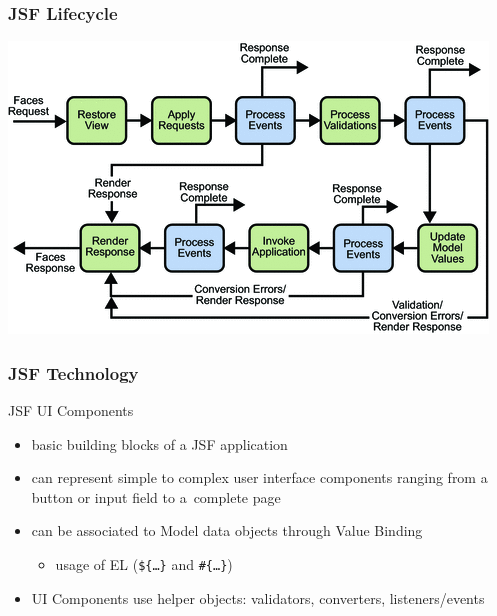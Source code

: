 \documentclass[10pt,xcolor=pdflatex]{beamer}
\begin{document}
\begin{frame}\frametitle{JSF Lifecycle}
\begin{center}
  \includegraphics[scale=0.65]{img/obr7}
\end{center}
\end{frame}


\begin{frame}\frametitle{JSF Technology}
  	\quad JSF UI Components
    \medskip
	\begin{itemize}
		\item basic building blocks of a JSF application
		\item can represent simple to complex user interface components ranging from a button or input field to a~complete page
		\item can be associated to Model data objects through Value Binding
          \begin{itemize}
            \item usage of EL (\texttt{\$\{\ldots \}} and \texttt{\#\{\ldots \}})
          \end{itemize}
		\item UI Components use helper objects: validators, converters, listeners/events
	\end{itemize}
\end{frame}
\end{document}

